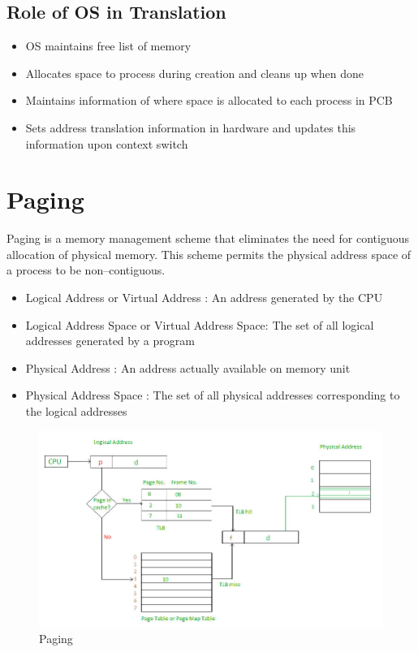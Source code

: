 \documentclass{article}
\begin{document}
\subsection{Role of OS in Translation}
\begin{itemize}
    \item OS maintains free list of memory
    \item Allocates space to process during creation and cleans up when done
    \item Maintains information of where space is allocated to each process in PCB
    \item Sets address translation information in hardware and updates this information upon context switch
\end{itemize}

\section{Paging}
Paging is a memory management scheme that eliminates the need for contiguous allocation of physical memory. This scheme permits the physical address space of a process to be non–contiguous.
\begin{itemize}
    \item Logical Address or Virtual Address : An address generated by the CPU
    \item Logical Address Space or Virtual Address Space: The set of all logical addresses generated by a program
    \item Physical Address : An address actually available on memory unit
    \item Physical Address Space : The set of all physical addresses corresponding to the logical addresses
\end{itemize}

    \begin{figure}[ht]
     \centering
     \includegraphics[scale = 0.45]{img/paging.jpg}
     \caption{Paging}
    \end{figure}
\end{document}

